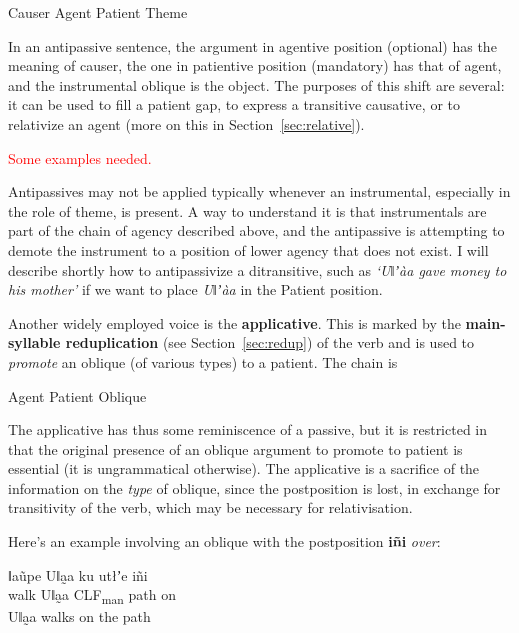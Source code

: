 \documentclass[11pt,a5paper]{book}
\newcommand{\qcn}[1]{\textcolor{AccentText}{\large\textbf{#1}}}
\newcommand{\transl}[2]{\qcn{#1} \emph{#2}}
\newcommand{\grammsc}[1]{\textsc{#1}}
\newcommand{\CLF}[1]{\grammsc{CLF}\textsubscript{#1}}
\newcommand{\cmnt}[1]{\textcolor{red}{#1}}
\begin{document}
\begin{center}
	Causer \textrightarrow Agent \textrightarrow Patient \textrightarrow Theme
\end{center}

In an antipassive sentence, the argument in agentive position (optional) has the meaning of causer, the one in patientive position (mandatory) has that of agent, and the instrumental oblique is the object. The purposes of this shift are several: it can be used to fill a patient gap, to express a transitive causative, or to relativize an agent (more on this in Section~\ref{sec:relative}).

\cmnt{Some examples needed.}

Antipassives may not be applied typically whenever an instrumental, especially in the role of theme, is present. A way to understand it is that instrumentals are part of the chain of agency described above, and the antipassive is attempting to demote the instrument to a position of lower agency that does not exist. I will describe shortly how to antipassivize a ditransitive, such as \emph{`Uǁʼàa gave money to his mother'} if we want to place \emph{Uǁʼàa} in the Patient position.

Another widely employed voice is the \textbf{applicative}. This is marked by the \textbf{main-syllable reduplication} (see Section~\ref{sec:redup}) of the verb and is used to \emph{promote} an oblique (of various types) to a patient. The chain is

\begin{center}
	Agent \textleftarrow Patient \textleftarrow Oblique
\end{center}

The applicative has thus some reminiscence of a passive, but it is restricted in that the original presence of an oblique argument to promote to patient is essential (it is ungrammatical otherwise). The applicative is a sacrifice of the information on the \emph{type} of oblique, since the postposition is lost, in exchange for transitivity of the verb, which may be necessary for relativisation.

Here's an example involving an oblique with the postposition \transl{iñi}{over}:

\begin{exe}
\ex
\gll ǁaũpe Uǁa̰a ku utłʼe iñi\\
walk Uǁa̰a \CLF{man} path on\\
\glt Uǁa̰a walks on the path
\end{exe}
\end{document}
